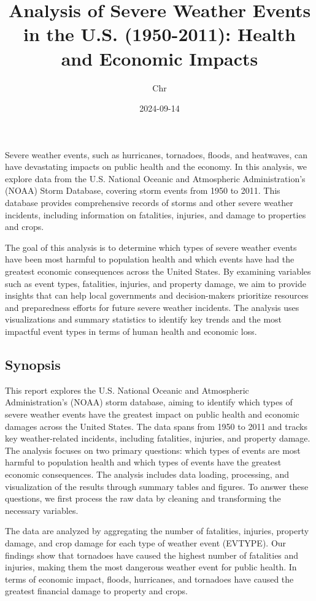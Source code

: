 \documentclass[
]{article}
\title{Analysis of Severe Weather Events in the U.S. (1950-2011): Health
and Economic Impacts}
\author{Chr}
\date{2024-09-14}
\begin{document}
\maketitle

Severe weather events, such as hurricanes, tornadoes, floods, and
heatwaves, can have devastating impacts on public health and the
economy. In this analysis, we explore data from the U.S. National
Oceanic and Atmospheric Administration's (NOAA) Storm Database, covering
storm events from 1950 to 2011. This database provides comprehensive
records of storms and other severe weather incidents, including
information on fatalities, injuries, and damage to properties and crops.

The goal of this analysis is to determine which types of severe weather
events have been most harmful to population health and which events have
had the greatest economic consequences across the United States. By
examining variables such as event types, fatalities, injuries, and
property damage, we aim to provide insights that can help local
governments and decision-makers prioritize resources and preparedness
efforts for future severe weather incidents. The analysis uses
visualizations and summary statistics to identify key trends and the
most impactful event types in terms of human health and economic loss.

\hypertarget{synopsis}{%
\subsection{Synopsis}\label{synopsis}}

This report explores the U.S. National Oceanic and Atmospheric
Administration's (NOAA) storm database, aiming to identify which types
of severe weather events have the greatest impact on public health and
economic damages across the United States. The data spans from 1950 to
2011 and tracks key weather-related incidents, including fatalities,
injuries, and property damage. The analysis focuses on two primary
questions: which types of events are most harmful to population health
and which types of events have the greatest economic consequences. The
analysis includes data loading, processing, and visualization of the
results through summary tables and figures. To answer these questions,
we first process the raw data by cleaning and transforming the necessary
variables.

The data are analyzed by aggregating the number of fatalities, injuries,
property damage, and crop damage for each type of weather event
(EVTYPE). Our findings show that tornadoes have caused the highest
number of fatalities and injuries, making them the most dangerous
weather event for public health. In terms of economic impact, floods,
hurricanes, and tornadoes have caused the greatest financial damage to
property and crops.
\end{document}
